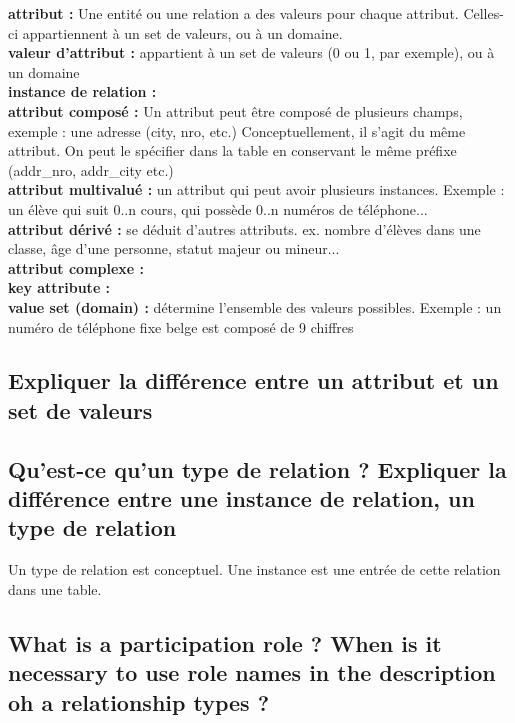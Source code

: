 \textbf{attribut :} Une entité ou une relation a des valeurs pour chaque attribut.
Celles-ci appartiennent à un set de valeurs, ou à un domaine.\\

\textbf{valeur d'attribut :} appartient à un set de valeurs (0 ou 1, par exemple), ou à un domaine\\

\textbf{instance de relation :} \\

\textbf{attribut composé :} Un attribut peut être composé de plusieurs champs, exemple : une adresse (city, nro, etc.) Conceptuellement, il s'agit du même attribut. On peut le spécifier dans la table en conservant le même préfixe (addr\_nro, addr\_city etc.)
\\

\textbf{attribut multivalué :} un attribut qui peut avoir plusieurs instances. 
Exemple : un élève qui suit 0..n cours, qui possède 0..n numéros de téléphone...\\

\textbf{attribut dérivé :} se déduit d'autres attributs. ex. nombre d'élèves dans une classe, âge d'une personne, statut majeur ou mineur...\\
\textbf{attribut complexe :} \\
\textbf{key attribute :} \\
\textbf{value set (domain) :} détermine l'ensemble des valeurs possibles. 
Exemple : un numéro de téléphone fixe belge est composé de 9 chiffres\\

\subsection{Expliquer la différence entre un attribut et un set de valeurs}

\subsection{Qu'est-ce qu'un type de relation ? Expliquer la différence entre une instance de relation, un type de relation}
Un type de relation est conceptuel. Une instance est une entrée de cette relation dans une table.

\subsection{What is a participation role ? When is it necessary to use role names in the description oh a relationship types ?}

